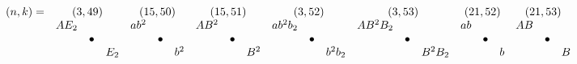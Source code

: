 \documentclass{article}
\begin{document}
\(
\begin{array}{crclrclrclrclrclrclrclrcl}
  (n,k)= & \multicolumn{3}{c}{(3,49)} & \multicolumn{3}{c}{(15,50)} & \multicolumn{3}{c}{(15,51)} & \multicolumn{3}{c}{(3,52)} & \multicolumn{3}{c}{(3,53)} & \multicolumn{3}{c}{(21,52)} & \multicolumn{3}{c}{(21,53)} &  \\
  & AE_2 & & & ab^2 & & & AB^2 & & & ab^2b_2 & & & AB^2B_2 & & & ab & & & AB & & & & & \\
  & & \bullet & & & \bullet & & & \bullet & & & \bullet & & & \bullet & & & \bullet & & & \bullet & & & & \\
  & & & E_2 & & & b^2 & & & B^2& & & b^2b_2 & & & B^2B_2 & & & b & & & B & & & 
\end{array}
\)\\
\end{document}
